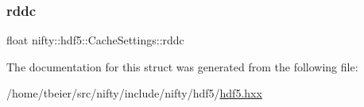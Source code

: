 \subsubsection{\texorpdfstring{rddc}{rddc}}
{\footnotesize\ttfamily float nifty\+::hdf5\+::\+Cache\+Settings\+::rddc}



The documentation for this struct was generated from the following file\+:\begin{DoxyCompactItemize}
\item 
/home/tbeier/src/nifty/include/nifty/hdf5/\hyperlink{hdf5_8hxx}{hdf5.\+hxx}\end{DoxyCompactItemize}
